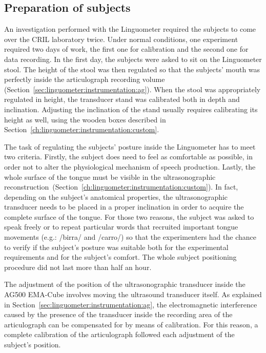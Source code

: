\subsection{Preparation of subjects}
\label{sec:experiments:preparation}
An investigation performed with the Linguometer required the subjects to come
over the CRIL laboratory twice.
Under normal conditions, one experiment required two days of work, the first
one for calibration and the second one for data recording.
In the first day, the subjects were asked to sit on the Linguometer stool. 
The height of the stool was then regulated so that the subjects' mouth was
perfectly inside the articulograph recording volume
(Section~\ref{sec:linguometer:instrumentation:ag}).
When the stool was appropriately regulated in height, the transducer stand was
calibrated both in depth and inclination. 
Adjusting the inclination of the stand usually requires calibrating its height as
well, using the wooden boxes described
in Section~\ref{ch:linguometer:instrumentation:custom}.


The task of regulating the subjects' posture inside the Linguometer has to meet
two criteria. Firstly, the subject does need to feel as comfortable as possible,
in order not to alter the physiological mechanism of speech production.
Lastly, the whole surface of the tongue must be visible in the ultrasonographic
reconstruction~(Section~\ref{ch:linguometer:instrumentation:custom}).
In fact, depending on the subject's anatomical properties, the ultrasonographic
transducer needs to be placed in a proper inclination in order to acquire
the complete surface of the tongue.
For those two reasons, the subject was asked to speak freely or to repeat
particular words that recruited important tongue movements
(e.g.: /birra/ and /carro/) so that the experimenters had the chance to verify
if the subject's posture was suitable both for the experimental requirements 
and for the subject's comfort.
The whole subject positioning procedure did not last more than half an hour. 

The adjustment of the position of the ultrasonographic transducer inside the
AG500 EMA-Cube involves moving the ultrasound transducer itself.
As explained in Section~\ref{sec:linguometer:instrumentation:ag}, the electromagnetic
interference caused by the presence of the transducer inside the recording area
of the articulograph can be compensated for by means of calibration.
For this reason, a complete calibration of the articulograph followed each
 adjustment of the subject's position.\\

